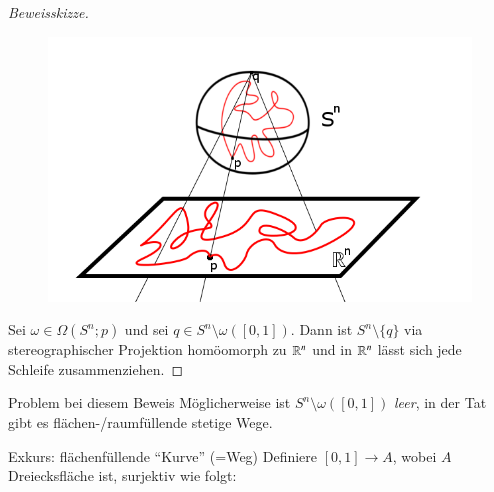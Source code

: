 \documentclass[a4paper,10pt]{scrartcl}
\begin{document}
\begin{exs*}
\begin{enumerate}[(1)]
\begin{figure}[H]
\end{figure}
\begin{proof}[Beweisskizze]
\begin{figure}
\centering
\includegraphics[scale=0.3]{fig59.png}
\end{figure}
 Sei $\omega \in \Omega(S^n;p)$ und sei $q\in S^n\setminus \omega([0,1])$. Dann ist $S^n\setminus\{q\}$ via stereographischer Projektion homöomorph zu $\mathbb{R}^n$ und in $\mathbb{R}^n$ lässt sich jede Schleife zusammenziehen.
\end{proof}
\begin{seg}{Problem bei diesem Beweis}
 Möglicherweise ist $S^n \setminus \omega([0,1])$ \emph{leer}, in der Tat gibt es flächen-/raumfüllende stetige Wege.
\end{seg}
\begin{seg}{Exkurs: flächenfüllende "`Kurve"' (=Weg)}
 Definiere $[0,1] \to A $, wobei $A$ Dreiecksfläche ist, surjektiv wie folgt:


\end{seg}
\end{enumerate}
\end{exs*}
\end{document}
